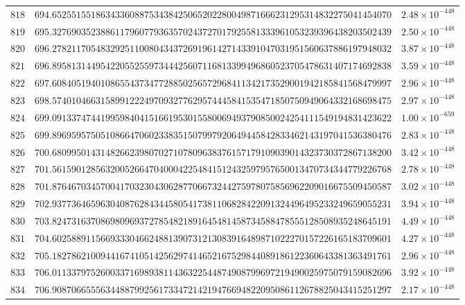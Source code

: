 \documentclass[12pt,reqno]{amsart}
\theoremstyle{remark}
\begin{document}
\begin{longtable}{clc}
$818$ & $694.6525515518634336088753438425065202280049871666231295314832275041454070$ & $2.48\times 10^{-448}$ \\
$819$ & $695.3276903523886117960779363570243727017925581333961053239396438203502439$ & $2.50\times 10^{-448}$ \\
$820$ & $696.2782117054832925110080434372691961427143391047031951560637886197948032$ & $3.87\times 10^{-448}$ \\
$821$ & $696.8958131449542205525597344425607116813399496860523705478631407174692838$ & $3.59\times 10^{-448}$ \\
$822$ & $697.6084051940108655437347728850256572968411342173529001942185841568479997$ & $2.96\times 10^{-448}$ \\
$823$ & $698.5740104663158991222497093277629574445841535471850750949064332168698475$ & $2.97\times 10^{-448}$ \\
$824$ & $699.0913374744199598404151661953015580069493790850024254111549194831423622$ & $1.00\times 10^{-659}$ \\
$825$ & $699.8969595750510866470602338351507997920649445842833462143197041536380476$ & $2.83\times 10^{-448}$ \\
$826$ & $700.6809950143148266239807027107809638376157179109039014323730372867138200$ & $3.42\times 10^{-448}$ \\
$827$ & $701.5615901285632005266470400042254841512432597957650013470734344779226768$ & $2.78\times 10^{-448}$ \\
$828$ & $701.8764670345700417032304306287706673244275978075856962209016675509450587$ & $3.02\times 10^{-448}$ \\
$829$ & $702.9377364659630408762843445805417381106828422091324496495233249659055231$ & $3.94\times 10^{-448}$ \\
$830$ & $703.8247316370869809693727854821891645481458734588478555128508935248645191$ & $4.49\times 10^{-448}$ \\
$831$ & $704.6025889115669333046624881390731213083916489871022270157226165183709601$ & $4.27\times 10^{-448}$ \\
$832$ & $705.1827862100944167410514256297414652167529844089186122360643381363491761$ & $2.96\times 10^{-448}$ \\
$833$ & $706.0113379752600337169893811436322544874908799697219490025975079159082696$ & $3.92\times 10^{-448}$ \\
$834$ & $706.9087066555634488799256173347214219476694822095086112678825043415251297$ & $2.17\times 10^{-448}$ \\

\end{longtable}
\end{document}
